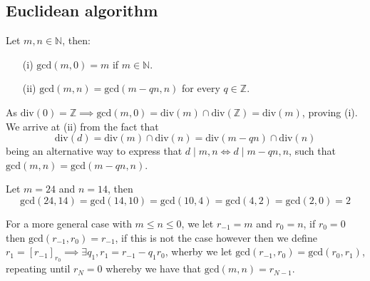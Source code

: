 \subsection{Euclidean algorithm}
\begin{prop}
    Let $m,n\in\mathbb{N}$, then:
    \begin{itemize}
        \item[(i)] $\text{gcd}(m,0)=m$ if $m\in\mathbb{N}$.
        \item[(ii)] $\text{gcd}(m,n)=\text{gcd}(m-qn,n)$ for every $q\in\mathbb{Z}$.
    \end{itemize}
\end{prop}
\begin{prf}
    As $\text{div}(0)=\mathbb{Z}\implies\text{gcd}(m,0)=\text{div}(m)\cap\text{div}(\mathbb{Z})=\text{div}(m)$, proving (i). We arrive at (ii) from the fact that
    \[
        \text{div}(d)=\text{div}(m)\cap\text{div}(n)=\text{div}(m-qn)\cap\text{div}(n)
    \]
    being an alternative way to express that $d\mid m,n\iff d\mid m-qn,n$, such that $\text{gcd}(m,n)=\text{gcd}(m-qn,n)$.
\end{prf}
\begin{exmp}
    Let $m=24$ and $n=14$, then
    \[
        \text{gcd}(24,14)=\text{gcd}(14,10)=\text{gcd}(10,4)=\text{gcd}(4,2)=\text{gcd}(2,0)=2
    \]\vskip -10pt
\end{exmp}
For a more general case with $m\leq n\leq 0$, we let $r_{-1}=m$ and $r_{0}=n$, if $r_{0}=0$ then $\text{gcd}(r_{-1},r_{0})=r_{-1}$, if this is not the case however then we define $r_{1}=[r_{-1}]_{r_{0}}\implies \exists q_{1},r_{1}=r_{-1}-q_{1}r_{0}$, wherby we let $\text{gcd}(r_{-1},r_{0})=\text{gcd}(r_{0},r_{1})$, repeating until $r_{N}=0$ whereby we have that $\text{gcd}(m,n)=r_{N-1}$.

